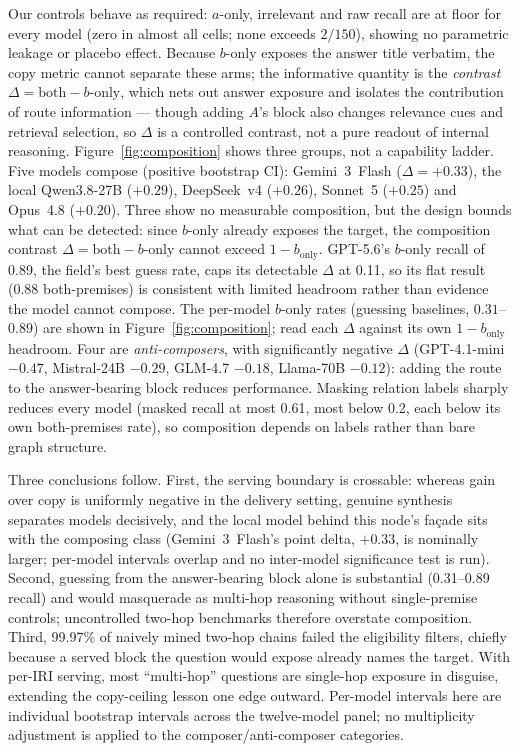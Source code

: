 \documentclass[10pt,twocolumn]{article}
\begin{document}
Our controls behave as required: $a$-only, irrelevant and raw recall are at floor for every
model (zero in almost all cells; none exceeds $2/150$), showing no parametric leakage or placebo
effect. Because $b$-only exposes the answer title verbatim, the copy metric cannot separate these arms;
the informative quantity is the \emph{contrast} $\Delta=\text{both}-b\text{-only}$, which nets out
answer exposure and isolates the contribution of route information --- though adding $A$'s block
also changes relevance cues and retrieval selection, so $\Delta$ is a controlled contrast, not a
pure readout of internal reasoning.
Figure~\ref{fig:composition} shows three groups, not a capability ladder. Five models compose
(positive bootstrap CI): Gemini~3~Flash ($\Delta=+0.33$), the local Qwen3.8-27B ($+0.29$),
DeepSeek~v4 ($+0.26$), Sonnet~5 ($+0.25$) and Opus~4.8 ($+0.20$). Three show no measurable
composition, but the design bounds what can be detected: since $b$-only already exposes the
target, the composition contrast $\Delta=\text{both}-b\text{-only}$ cannot exceed $1-b_{\text{only}}$.
GPT-5.6's $b$-only recall of 0.89, the field's best guess rate, caps its detectable $\Delta$
at 0.11, so its flat result (0.88 both-premises) is consistent with limited headroom rather than
evidence the model cannot compose. The per-model $b$-only rates (guessing baselines, $0.31$--$0.89$) are shown in
Figure~\ref{fig:composition}; read each $\Delta$ against its own $1-b_{\text{only}}$ headroom.
Four are \emph{anti-composers}, with significantly
negative $\Delta$ (GPT-4.1-mini $-0.47$, Mistral-24B $-0.29$, GLM-4.7 $-0.18$, Llama-70B
$-0.12$): adding the route to the answer-bearing block reduces performance. Masking relation
labels sharply reduces every model (masked recall at most 0.61, most below 0.2, each below its
own both-premises rate), so composition depends on labels rather than bare graph structure.

Three conclusions follow. First, the serving boundary is crossable: whereas gain over copy is
uniformly negative in the delivery setting, genuine synthesis separates models decisively, and
the local model behind this node's fa\c{c}ade sits with the composing class (Gemini~3~Flash's
point delta, $+0.33$, is nominally larger; per-model intervals overlap and no inter-model
significance test is run). Second, guessing from
the answer-bearing block alone is substantial (0.31--0.89 recall) and would masquerade as
multi-hop reasoning without single-premise controls; uncontrolled two-hop benchmarks therefore
overstate composition. Third, 99.97\% of naively mined two-hop chains failed the eligibility
filters, chiefly because a served block the question would expose already names the target.
With per-IRI serving, most ``multi-hop'' questions are single-hop exposure in disguise,
extending the copy-ceiling lesson one edge outward. Per-model intervals here are individual
bootstrap intervals across the twelve-model panel; no multiplicity adjustment is applied to the
composer/anti-composer categories.
\end{document}
